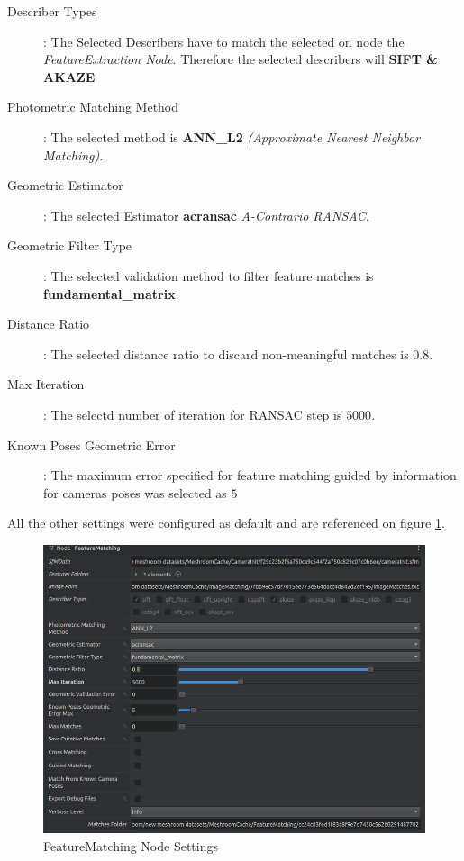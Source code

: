 \documentclass[12pt]{report}
\begin{document}
\begin{description}
  \item[Describer Types]: The Selected Describers have to  match the selected on node the \textit{FeatureExtraction Node}. Therefore the selected describers will \textbf{SIFT \& AKAZE}
  \item[Photometric Matching Method]: The selected method is \textbf{ANN\_L2} \textit{(Approximate Nearest Neighbor Matching)}.
  \item[Geometric Estimator]: The selected Estimator \textbf{acransac}  \textit{A-Contrario RANSAC}.
  \item[Geometric Filter Type]: The selected validation method to filter feature matches is \textbf{fundamental\_matrix}.
  \item[Distance Ratio]: The selected distance ratio to discard non-meaningful matches  is $0.8$.
  \item[Max Iteration]: The selectd number of iteration for RANSAC step is $5000$.
  \item[Known Poses Geometric Error] : The maximum error specified for feature matching guided by information for cameras poses was selected as $5$
\end{description}
All the other settings were configured as default and are referenced on figure \ref{fig:fEATUREmATCHING}.

\begin{figure}[H]%
  \centering
 \includegraphics[width=1\textwidth]{featurematchingNOde.png}
\caption{FeatureMatching Node Settings}
\label{fig:fEATUREmATCHING} 
\end{figure}
\end{document}
